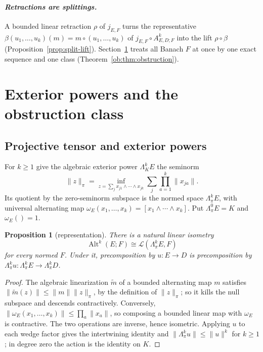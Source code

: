 \documentclass[11pt]{amsart}
\newtheorem{proposition}[theorem]{Proposition}
\theoremstyle{definition}
\theoremstyle{remark}
\numberwithin{equation}{section}
\newcommand{\cL}{\mathcal L}
\newcommand{\Alt}{\operatorname{Alt}}
\newcommand{\norm}[1]{\lVert #1\rVert}
\theoremstyle{plain}
\theoremstyle{definition}
\theoremstyle{plain}
\begin{document}
\paragraph{\textit{Retractions are splittings.}}
A bounded linear retraction $\rho$ of $j_{E,F}$ turns the representative $\beta(u_1,\ldots,u_k)(m)=m\circ(u_1,\ldots,u_k)$ of $j_{E,F}\circ A^k_{E,D;F}$ into the lift $\rho\circ\beta$ (Proposition~\ref{prop:split-lift}). Section~\ref{sec:duality} treats all Banach $F$ at once by one exact sequence and one class (Theorem~\ref{ob:thm:obstruction}).
\section{Exterior powers and the obstruction class}\label{sec:duality}

\subsection{Projective tensor and exterior powers}\label{ob:ssec:powers}

For $k\ge1$ give the algebraic exterior power $\Lambda^k_KE$ the seminorm
\[
 \norm z_\pi=\inf_{z=\sum_jx_{j1}\wedge\cdots\wedge x_{jk}}
                 \sum_j\prod_{a=1}^k\norm{x_{ja}}.
\]
Its quotient by the zero-seminorm subspace is the normed space $\Lambda^k_\pi E$, with universal alternating map
$\omega_E(x_1,\ldots,x_k)=[x_1\wedge\cdots\wedge x_k]$. Put $\Lambda^0_\pi E=K$ and $\omega_E()=1$.

\begin{proposition}[representation]\label{prop:exterior}
There is a natural linear isometry
\[
 \Alt^k(E;F)\cong\cL(\Lambda^k_\pi E,F)
\]
for every normed $F$. Under it, precomposition by $u\colon E\to D$ is precomposition by
$\Lambda^k_\pi u\colon\Lambda^k_\pi E\to\Lambda^k_\pi D$.
\end{proposition}
\begin{proof}
The algebraic linearization $\widetilde m$ of a bounded alternating map $m$ satisfies
$\norm{\widetilde m(z)}\le\norm m\norm z_\pi$, by the definition of $\norm z_\pi$; so it kills the null subspace and
descends contractively. Conversely, $\norm{\omega_E(x_1,\ldots,x_k)}\le\prod_a\norm{x_a}$, so composing a bounded linear
map with $\omega_E$ is contractive. The two operations are inverse, hence isometric. Applying $u$ to each
wedge factor gives the intertwining identity and $\norm{\Lambda^k_\pi u}\le\norm u^k$ for $k\ge1$; in degree zero the
action is the identity on $K$.
\end{proof}
\end{document}
